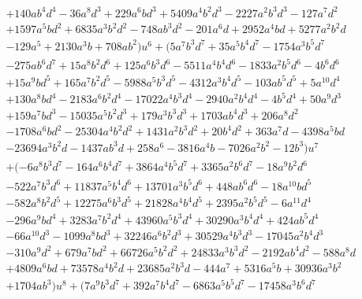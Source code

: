 \documentclass{gtpart}
\theoremstyle{definition}
\theoremstyle{remark}
\numberwithin{equation}{section}
\numberwithin{thm}{section}
\begin{document}
\begin{equation*}
\begin{split}
\quad ~~~ & + 140 a b^4 d^4 - 36 a^8 d^3 + 229 a^6 b d^3 + 5409 a^4 b^2 d^3 - 2227 a^2 b^3 d^3 - 127 a^7 d^2 \\
          & + 1597 a^5 b d^2 + 6835 a^3 b^2 d^2 - 748 a b^3 d^2 - 201 a^6 d + 2952 a^4 b d + 5277 a^2 b^2 d \\
          & - 129 a^5 + 2130 a^3 b + 708 a b^2) u^6 + (5 a^7 b^3 d^7 + 35 a^5 b^4 d^7 - 1754 a^3 b^5 d^7 \\
          & - 275 a b^6 d^7 + 15 a^8 b^2 d^6 + 125 a^6 b^3 d^6 - 5511 a^4 b^4 d^6 - 1833 a^2 b^5 d^6 - 4 b^6 d^6 \\
          & + 15 a^9 b d^5 + 165 a^7 b^2 d^5 - 5988 a^5 b^3 d^5 - 4312 a^3 b^4 d^5 - 103 a b^5 d^5 + 5 a^{10} d^4 \\
          & + 130 a^8 b d^4 - 2183 a^6 b^2 d^4 - 17022 a^4 b^3 d^4 - 2940 a^2 b^4 d^4 - 4 b^5 d^4 + 50 a^9 d^3 \\
          & + 159 a^7 b d^3 - 15035 a^5 b^2 d^3 + 179 a^3 b^3 d^3 + 1703 a b^4 d^3 + 206 a^8 d^2 \\
          & - 1708 a^6 b d^2 - 25304 a^4 b^2 d^2 + 1431 a^2 b^3 d^2 + 20 b^4 d^2 + 363 a^7 d - 4398 a^5 b d \\
          & - 23694 a^3 b^2 d - 1437 a b^3 d + 258 a^6 - 3816 a^4 b - 7026 a^2 b^2 - 12 b^3) u^7 \\
          & + (-6 a^8 b^3 d^7 - 164 a^6 b^4 d^7 + 3864 a^4 b^5 d^7 + 3365 a^2 b^6 d^7 - 18 a^9 b^2 d^6 \\
          & - 522 a^7 b^3 d^6 + 11837 a^5 b^4 d^6 + 13701 a^3 b^5 d^6 + 448 a b^6 d^6 - 18 a^{10} b d^5 \\
          & - 582 a^8 b^2 d^5 + 12275 a^6 b^3 d^5 + 21828 a^4 b^4 d^5 + 2395 a^2 b^5 d^5 - 6 a^{11} d^4 \\
          & - 296 a^9 b d^4 + 3283 a^7 b^2 d^4 + 43960 a^5 b^3 d^4 + 30290 a^3 b^4 d^4 + 424 a b^5 d^4 \\
          & - 66 a^{10} d^3 - 1099 a^8 b d^3 + 32246 a^6 b^2 d^3 + 30529 a^4 b^3 d^3 - 17045 a^2 b^4 d^3 \\
          & - 310 a^9 d^2 + 679 a^7 b d^2 + 66726 a^5 b^2 d^2 + 24833 a^3 b^3 d^2 - 2192 a b^4 d^2 - 588 a^8 d \\
          & + 4809 a^6 b d + 73578 a^4 b^2 d + 23685 a^2 b^3 d - 444 a^7 + 5316 a^5 b + 30936 a^3 b^2 \\
          & + 1704 a b^3) u^8 + (7 a^9 b^3 d^7 + 392 a^7 b^4 d^7 - 6863 a^5 b^5 d^7 - 17458 a^3 b^6 d^7 \\

\end{split}
\end{equation*}
\end{document}
